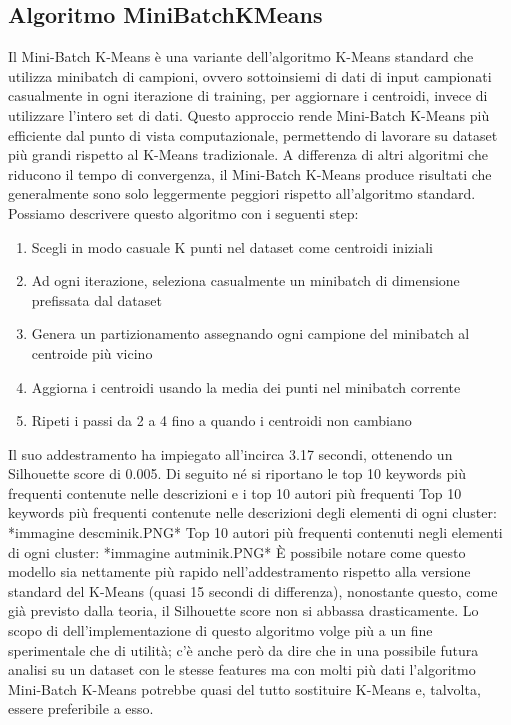 \documentclass[12pt,oneside]{article}
\begin{document}
    \begin{enumerate}
    \subsection{Algoritmo MiniBatchKMeans}
    \begin{justify}
    Il Mini-Batch K-Means è una variante dell'algoritmo K-Means standard che utilizza minibatch di campioni, ovvero sottoinsiemi di dati di input campionati casualmente in ogni iterazione di training, per aggiornare i centroidi, invece di utilizzare l'intero set di dati. Questo approccio rende Mini-Batch K-Means più efficiente dal punto di vista computazionale, permettendo di lavorare su dataset più grandi rispetto al K-Means tradizionale. A differenza di altri algoritmi che riducono il tempo di convergenza, il Mini-Batch K-Means produce risultati che generalmente sono solo leggermente peggiori rispetto all’algoritmo standard. 
    Possiamo descrivere questo algoritmo con i seguenti step:

    \begin{enumerate}[label=\arabic*)]
        \item Scegli in modo casuale K punti nel dataset come centroidi iniziali
        \item Ad ogni iterazione, seleziona casualmente un minibatch di dimensione prefissata dal dataset
        \item Genera un partizionamento assegnando ogni campione del minibatch al centroide più vicino 
        \item Aggiorna i centroidi usando la media dei punti nel minibatch corrente
        \item Ripeti i passi da 2 a 4 fino a quando i centroidi non cambiano
    \end{enumerate}
    Il suo addestramento ha impiegato all’incirca 3.17 secondi, ottenendo un Silhouette score di 0.005. Di seguito né si riportano le top 10 keywords più frequenti contenute nelle descrizioni e i top 10 autori più frequenti
    Top 10 keywords più frequenti contenute nelle descrizioni degli elementi di ogni cluster:
    *immagine descminik.PNG*
    Top 10 autori più frequenti contenuti negli elementi di ogni cluster:
    *immagine autminik.PNG*
    È possibile notare come questo modello sia nettamente più rapido nell’addestramento rispetto alla versione standard del K-Means (quasi 15 secondi di differenza), nonostante questo, come già previsto dalla teoria, il Silhouette score non si abbassa drasticamente. Lo scopo di dell’implementazione di questo algoritmo volge più a un fine sperimentale che di utilità; c’è anche però da dire che in una possibile futura analisi su un dataset con le stesse features ma con molti più dati l’algoritmo Mini-Batch K-Means potrebbe quasi del tutto sostituire K-Means e, talvolta, essere preferibile a esso.
    \end{justify}
    \end{enumerate}
\end{document}
